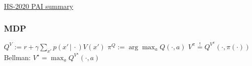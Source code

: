 \documentclass[11pt]{article}
\newcommand{\given}{\,|\,}
\newcommand{\slot}{{\cdot}}
\begin{document}
\href{https://github.com/numpde/pai_summary}{HS-2020 PAI summary}
{\tiny\color{lightgray}\hfill{\DTMnow}}

\subsubsection*{MDP} 

$
	Q^V := 
	r + \gamma \sum_{x'} p(x' \given \slot) V(x')
$
\quad
$
	\pi^Q := \arg\max_a Q(\slot, a)
$
\quad
$
	V^\pi \stackrel{!}{=} Q^{V^\pi}(\slot, \pi(\slot))
$
\quad
\hfill
Bellman:
$
	V^\star
	=
	\max_a
	Q^{V^\star}(\slot, a)
$

\leavevmode\vfill
\end{document}
